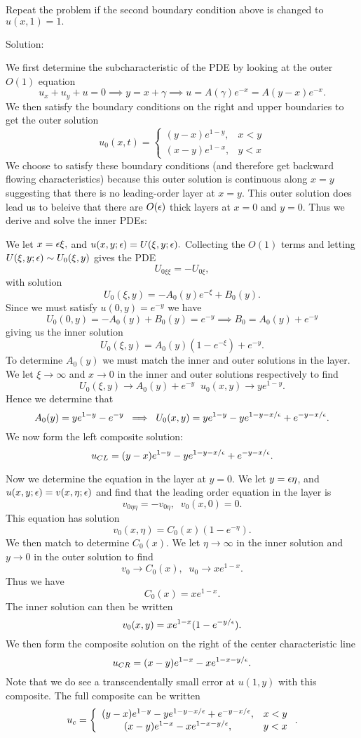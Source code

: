 \item Repeat the problem if the second boundary condition above is changed to $u(x,1) = 1.$

\eenum
Solution:\\

\benum
\item We first determine the subcharacteristic of the PDE by looking at the outer $O(1)$ equation
$$u_x+u_y+u=0\implies y=x+\gamma\implies u=A(\gamma)e^{-x}=A(y-x)e^{-x}.$$
We then satisfy the boundary conditions on the right and upper boundaries to get the outer solution
$$u_0(x,t)=\left\{\begin{array}{cc}(y-x)e^{1-y},&x<y\\(x-y)e^{1-x},&y<x\end{array}\right.$$
We choose to satisfy these boundary conditions (and therefore get backward flowing characteristics) because this outer solution is continuous along $x=y$ suggesting that there is no leading-order layer at $x=y.$ This outer solution does lead us to beleive that there are $O(\epsilon)$ thick layers at $x=0$ and $y=0.$ Thus we derive and solve the inner PDEs:
\benum
\item We let $x=\epsilon\xi,$ and $u(x,y;\epsilon)=U(\xi,y;\epsilon).$ Collecting the $O(1)$ terms and letting $U(\xi,y;\epsilon)\sim U_0(\xi,y)$ gives the PDE
$$U_{0\xi\xi}=-U_{0\xi},$$
with solution
$$U_0(\xi,y)=-A_0(y)e^{-\xi}+B_0(y).$$
Since we must satisfy $u(0,y)=e^{-y}$ we have
$$U_0(0,y)=-A_0(y)+B_0(y)=e^{-y}\implies B_0=A_0(y)+e^{-y}$$
giving us the inner solution
$$U_0(\xi,y)=A_0(y)(1-e^{-\xi})+e^{-y}.$$
To determine $A_0(y)$ we must match the inner and outer solutions in the layer. We let $\xi\to\infty$ and $x\to 0$ in the inner and outer solutions respectively to find
$$U_0(\xi,y)\to A_0(y)+e^{-y}\;\;u_0(x,y)\to ye^{1-y}.$$
Hence we determine that
$$A_0(y)=ye^{1-y}-e^{-y}\;\implies\;U_0(x,y)=ye^{1-y}-ye^{1-y-x/\epsilon}+e^{-y-x/\epsilon}.$$
We now form the left composite solution:
$$u_{CL}=(y-x)e^{1-y}-ye^{1-y-x/\epsilon}+e^{-y-x/\epsilon}.$$

\item Now we determine the equation in the layer at $y=0.$ We let $y=\epsilon\eta$, and $u(x,y;\epsilon)=v(x,\eta;\epsilon)$ and find that the leading order equation in the layer is
    $$v_{0\eta\eta}=-v_{0\eta},\;\;v_0(x,0)=0.$$
    This equation has solution
    $$v_0(x,\eta)=C_0(x)(1-e^{-\eta}).$$
    We then match to determine $C_0(x).$ We let $\eta\to\infty$ in the inner solution and $y\to 0$ in the outer solution to find
    $$v_0\to C_0(x),\;\;u_0\to xe^{1-x}.$$
    Thus we have
    $$C_0(x)=xe^{1-x}.$$
    The inner solution can then be written
    $$v_0(x,y)=xe^{1-x}(1-e^{-y/\epsilon}).$$
    We then form the composite solution on the right of the center characteristic line
    $$u_{CR}=(x-y)e^{1-x}-xe^{1-x-y/\epsilon}.$$
    Note that we do see a transcendentally small error at $u(1,y)$ with this composite.
    The full composite can be written
    $$u_c=\left\{\begin{array}{cc}(y-x)e^{1-y}-ye^{1-y-x/\epsilon}+e^{-y-x/\epsilon},&x<y\\(x-y)e^{1-x}-xe^{1-x-y/\epsilon},&y<x\end{array}\right..$$
    \eenum

